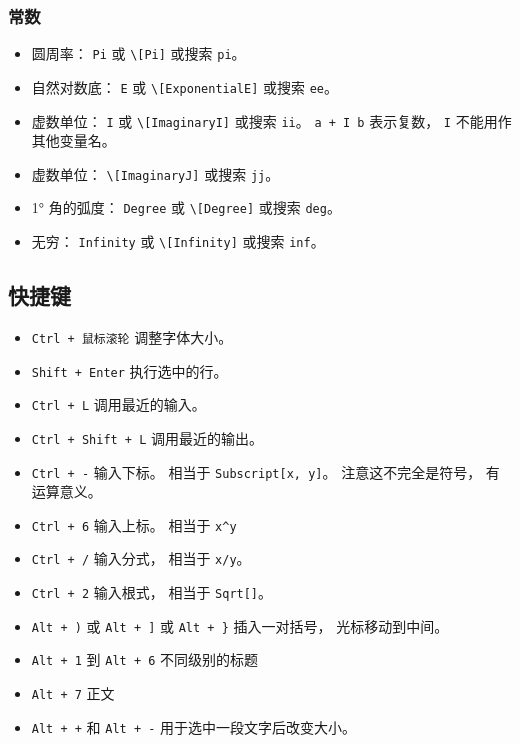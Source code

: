 \subsubsection{常数}

\begin{itemize}
\item 圆周率： \verb|Pi| 或 \verb|\[Pi]| 或搜索 \verb|pi|。
\item 自然对数底： \verb|E| 或 \verb|\[ExponentialE]| 或搜索 \verb|ee|。
\item 虚数单位： \verb|I| 或 \verb|\[ImaginaryI]| 或搜索 \verb|ii|。 \verb|a + I b| 表示复数， \verb|I| 不能用作其他变量名。
\item 虚数单位： \verb|\[ImaginaryJ]| 或搜索 \verb|jj|。
\item 1° 角的弧度： \verb|Degree| 或 \verb|\[Degree]| 或搜索 \verb|deg|。
\item 无穷： \verb|Infinity| 或 \verb|\[Infinity]| 或搜索 \verb|inf|。
\end{itemize}

\subsection{快捷键}
\begin{itemize}
\item \verb|Ctrl + 鼠标滚轮| 调整字体大小。
\item \verb|Shift + Enter| 执行选中的行。
\item \verb|Ctrl + L| 调用最近的输入。
\item \verb|Ctrl + Shift + L| 调用最近的输出。
\item \verb|Ctrl + -| 输入下标。 相当于 \verb|Subscript[x, y]|。 注意这不完全是符号， 有运算意义。
\item \verb|Ctrl + 6| 输入上标。 相当于 \verb|x^y|
\item \verb|Ctrl + /| 输入分式， 相当于 \verb|x/y|。
\item \verb|Ctrl + 2| 输入根式， 相当于 \verb|Sqrt[]|。
\item \verb|Alt + )| 或 \verb|Alt + ]| 或 \verb|Alt + }| 插入一对括号， 光标移动到中间。
\item \verb|Alt + 1| 到 \verb|Alt + 6| 不同级别的标题
\item \verb|Alt + 7| 正文
\item \verb|Alt + +| 和 \verb|Alt + -| 用于选中一段文字后改变大小。
\end{itemize}

